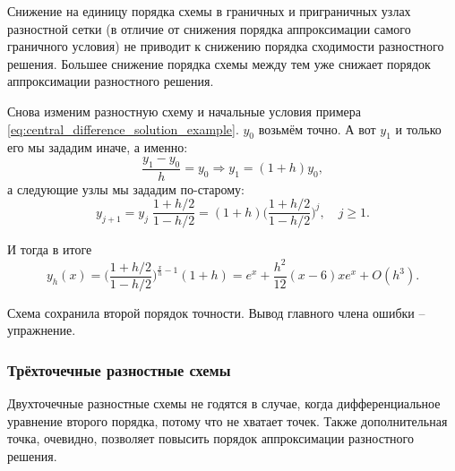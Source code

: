 \documentclass[../main.tex]{subfile}
\begin{document}
\begin{theorem}
	Снижение на единицу порядка схемы в граничных и приграничных узлах
	разностной сетки (в отличие от снижения порядка аппроксимации самого
	граничного условия) не приводит к снижению порядка сходимости
	разностного решения. Большее снижение порядка схемы между тем уже
	снижает порядок аппроксимации разностного решения.
\end{theorem}

\noproof

\begin{example}
	Снова изменим разностную схему и начальные условия примера
	\eqref{eq:central_difference_solution_example}. $y_0$ возьмём точно.
	А вот $y_1$ и только его мы зададим иначе, а именно:
	\[\frac{y_1-y_0}{h}=y_0\Rightarrow y_1=(1+h)y_0,\]
	а следующие узлы мы зададим по-старому:
	\[y_{j+1}=y_j\;\frac{1+h/2}{1-h/2}=(1+h)\Big(\frac{1+h/2}{1-h/2}\Big)^j,
	\quad j\ge 1.\]

	И тогда в итоге
	\[y_h(x)=\Big(\frac{1+h/2}{1-h/2}\Big)^{\frac{x}{h}-1}
	(1+h)=e^x+\frac{h^2}{12}(x-6)xe^x+O(h^3).\]

	Схема сохранила второй порядок точности. Вывод главного члена ошибки --
	упражнение.
\end{example}

\subsubsection{Трёхточечные разностные схемы}
Двухточечные разностные схемы не годятся в случае, когда дифференциальное
уравнение второго порядка, потому что не хватает точек. Также дополнительная
точка, очевидно, позволяет повысить порядок аппроксимации разностного решения.
\end{document}
